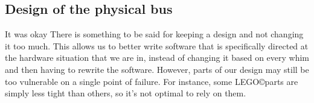 \subsection{Design of the physical bus}
It was okay
There is something to be said for keeping a design and not changing it too much. This allows us to better write software that is specifically directed at the hardware situation that we are in, instead of changing it based on every whim and then having to rewrite the software. 
However, parts of our design may still be too vulnerable on a single point of failure. For instance, some LEGO\copyright parts are simply less tight than others, so it's not optimal to rely on them.
